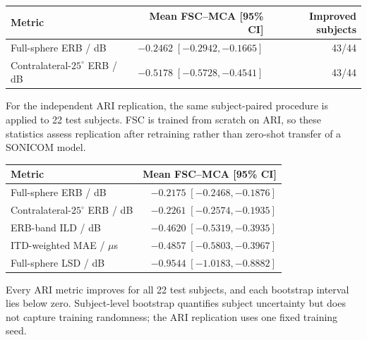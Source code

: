 \documentclass[UTF8,a4paper]{article}
\begin{document}
\begin{table}[htbp]
\centering\small
\begin{tabular}{lrr}
\toprule
Metric & Mean FSC--MCA [95\% CI] & Improved subjects \\
\midrule
Full-sphere ERB / dB & $-0.2462\;[-0.2942,-0.1665]$ & 43/44 \\
Contralateral-$25^\circ$ ERB / dB & $-0.5178\;[-0.5728,-0.4541]$ & 43/44 \\
\bottomrule
\end{tabular}
\end{table}

For the independent ARI replication, the same subject-paired procedure is applied to 22 test subjects. FSC is trained from scratch on ARI, so these statistics assess replication after retraining rather than zero-shot transfer of a SONICOM model.

\begin{table}[htbp]
\centering\small
\begin{tabular}{lr}
\toprule
Metric & Mean FSC--MCA [95\% CI] \\
\midrule
Full-sphere ERB / dB & $-0.2175\;[-0.2468,-0.1876]$ \\
Contralateral-$25^\circ$ ERB / dB & $-0.2261\;[-0.2574,-0.1935]$ \\
ERB-band ILD / dB & $-0.4620\;[-0.5319,-0.3935]$ \\
ITD-weighted MAE / $\mu$s & $-0.4857\;[-0.5803,-0.3967]$ \\
Full-sphere LSD / dB & $-0.9544\;[-1.0183,-0.8882]$ \\
\bottomrule
\end{tabular}
\end{table}

Every ARI metric improves for all 22 test subjects, and each bootstrap interval lies below zero. Subject-level bootstrap quantifies subject uncertainty but does not capture training randomness; the ARI replication uses one fixed training seed.
\end{document}
